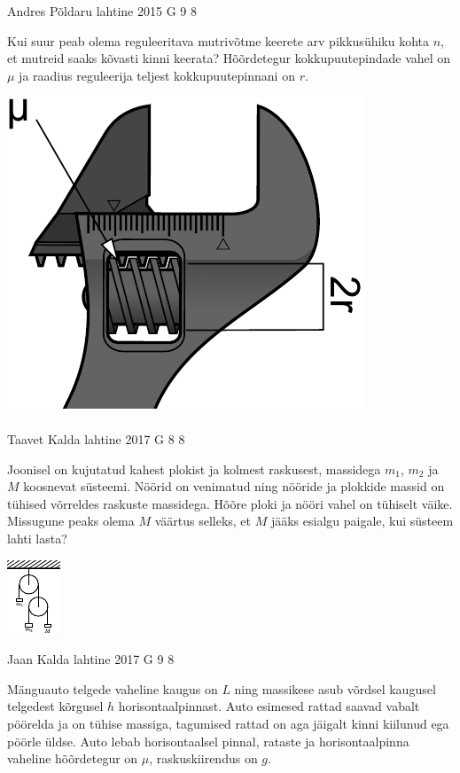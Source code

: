 \documentclass[11pt]{article}
\begin{document}
{%
{Andres Põldaru} %
{lahtine} %
{2015} %
{G 9} %
{8} %
{
\ifStatement
Kui suur peab olema reguleeritava mutrivõtme keerete arv pikkusühiku kohta $n$, et mutreid saaks kõvasti kinni keerata? Hõõrdetegur kokkupuutepindade vahel on $\mu$ ja raadius reguleerija teljest kokkupuutepinnani on $r$.
\begin{center}%
\includegraphics[width=0.4\linewidth]{2015-lahg-09-mutriv6ti_joonis}%
\end{center}
\fi
}

{Taavet Kalda} %
{lahtine} %
{2017} %
{G 8} %
{8} %
{
\ifStatement
Joonisel on kujutatud kahest plokist ja kolmest raskusest, massidega $m_1$, $m_2$ ja $M$ koosnevat süsteemi. Nöörid on venimatud ning nööride ja plokkide massid on tühised võrreldes raskuste massidega. Hõõre ploki ja nööri vahel on tühiselt väike. Missugune peaks olema $M$ väärtus selleks, et $M$ jääks esialgu paigale, kui süsteem lahti lasta?

\begin{center}
	\vspace{-10pt}
	\includegraphics[width = 0.3\linewidth] {2017-lahg-08-double_pulleys_img.pdf}
\end{center}
\fi
}

{Jaan Kalda} %
{lahtine} %
{2017} %
{G 9} %
{8} %
{
\ifStatement
Mänguauto telgede vaheline kaugus on $L$ ning massikese asub võrdsel kaugusel telgedest kõrgusel $h$ horisontaalpinnast. Auto esimesed rattad saavad vabalt pöörelda ja on tühise massiga, tagumised rattad on aga jäigalt kinni kiilunud ega pöörle üldse. Auto lebab horisontaalsel pinnal, rataste ja horisontaalpinna vaheline hõõrdetegur on $\mu$, raskuskiirendus on $g$.

}}
\end{document}
